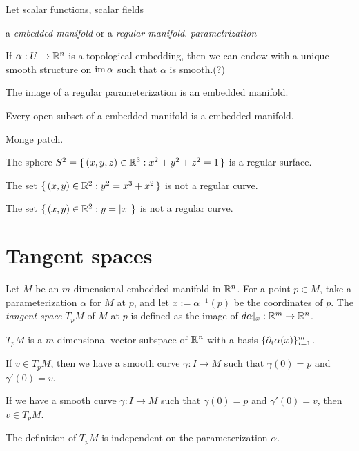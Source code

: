 \documentclass{../../large}
\renewcommand{\a}{\alpha}
\begin{document}
\begin{prb}
\end{prb}

\begin{prb}
Let
scalar functions, scalar fields
\end{prb}

\begin{prb}
a \emph{embedded manifold} or a \emph{regular manifold}.
\emph{parametrization}

If $\a:U\to\R^n$ is a topological embedding, then we can endow with a unique smooth structure on $\im\a$ such that $\a$ is smooth.(?)
\begin{parts}
\item The image of a regular parameterization is an embedded manifold.
\item Every open subset of a embedded manifold is a embedded manifold.
\item Monge patch.
\item The sphere $S^2=\{\,(x,y,z)\in\mathbb{R}^3:x^2+y^2+z^2=1\,\}$ is a regular surface.
\item The set $\{\,(x,y)\in\mathbb{R}^2:y^2=x^3+x^2\,\}$ is not a regular curve.
\item The set $\{\,(x,y)\in\mathbb{R}^2:y=|x|\,\}$ is not a regular curve.
\end{parts}
\end{prb}






\section{Tangent spaces}


\begin{prb}
Let $M$ be an $m$-dimensional embedded manifold in $\mathbb{R}^n$.
For a point $p\in M$, take a parameterization $\a$ for $M$ at $p$, and let $x:=\a^{-1}(p)$ be the coordinates of $p$.
The \emph{tangent space} $T_pM$ of $M$ at $p$ is defined as the image of $d\a|_x:\R^m\to\R^n$.
\begin{parts}
\item $T_pM$ is a $m$-dimensional vector subspace of $\mathbb{R}^n$ with a basis $\{\pd_i\alpha(x)\}_{i=1}^m$.
\item If $v\in T_pM$, then we have a smooth curve $\gamma:I\to M$ such that $\gamma(0)=p$ and $\gamma'(0)=v$.
\item If we have a smooth curve $\gamma:I\to M$ such that $\gamma(0)=p$ and $\gamma'(0)=v$, then $v\in T_pM$.
\item The definition of $T_pM$ is independent on the parameterization $\a$.
\end{parts}
\end{prb}
\end{document}
